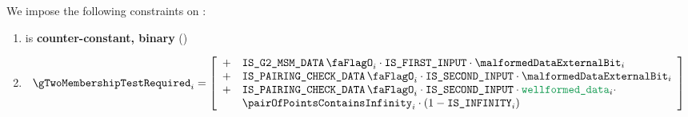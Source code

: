 \noindent
We impose the following constraints on \gTwoMembershipTestRequired{}:
\begin{enumerate}
    \item \gTwoMembershipTestRequired{} is \textbf{counter-constant, binary} \quad (\trash)
    \item 
        \[
            \gTwoMembershipTestRequired_{i} = 
                \left[ \begin{array}{cl} 
                    + & \isBlsGTwoMsmData_{i} \cdot \isFirstInput \cdot \malformedDataExternalBit_{i}  \\
                    + & \isBlsPairingCheckData_{i} \cdot \isSecondInput \cdot \malformedDataExternalBit_{i} \\
                    + & \isBlsPairingCheckData_{i} \cdot \isSecondInput \cdot \locWellformedData_{i} \cdot \\
                    & \pairOfPointsContainsInfinity_{i} \cdot (1 - \isInfinity_{i}) \\
                \end{array} \right] \\
        \]
\end{enumerate}


